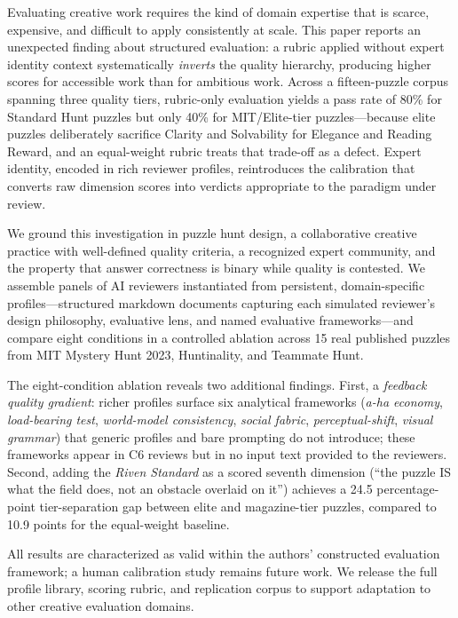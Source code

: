 Evaluating creative work requires the kind of domain expertise that is scarce, expensive,
and difficult to apply consistently at scale. This paper reports an unexpected finding
about structured evaluation: a rubric applied without expert identity context systematically
\emph{inverts} the quality hierarchy, producing higher scores for accessible work than for
ambitious work. Across a fifteen-puzzle corpus spanning three quality tiers, rubric-only
evaluation yields a pass rate of 80\% for Standard Hunt puzzles but only 40\% for
MIT/Elite-tier puzzles---because elite puzzles deliberately sacrifice Clarity and
Solvability for Elegance and Reading Reward, and an equal-weight rubric treats that
trade-off as a defect. Expert identity, encoded in rich reviewer profiles, reintroduces
the calibration that converts raw dimension scores into verdicts appropriate to the paradigm
under review.

We ground this investigation in puzzle hunt design, a collaborative creative practice with
well-defined quality criteria, a recognized expert community, and the property that answer
correctness is binary while quality is contested. We assemble panels of AI reviewers
instantiated from persistent, domain-specific profiles---structured markdown documents
capturing each simulated reviewer's design philosophy, evaluative lens, and named
evaluative frameworks---and compare eight conditions in a controlled ablation across 15
real published puzzles from MIT Mystery Hunt 2023, Huntinality, and Teammate Hunt.

The eight-condition ablation reveals two additional findings. First, a \emph{feedback
quality gradient}: richer profiles surface six analytical frameworks (\emph{a-ha economy},
\emph{load-bearing test}, \emph{world-model consistency}, \emph{social fabric},
\emph{perceptual-shift}, \emph{visual grammar}) that generic profiles and bare prompting
do not introduce; these frameworks appear in C6 reviews but in no input text provided to
the reviewers. Second, adding the \emph{Riven Standard} as a scored seventh dimension
(``the puzzle IS what the field does, not an obstacle overlaid on it'') achieves a
24.5 percentage-point tier-separation gap between elite and magazine-tier puzzles,
compared to 10.9 points for the equal-weight baseline.

All results are characterized as valid within the authors' constructed evaluation
framework; a human calibration study remains future work. We release the full profile
library, scoring rubric, and replication corpus to support adaptation to other
creative evaluation domains.
